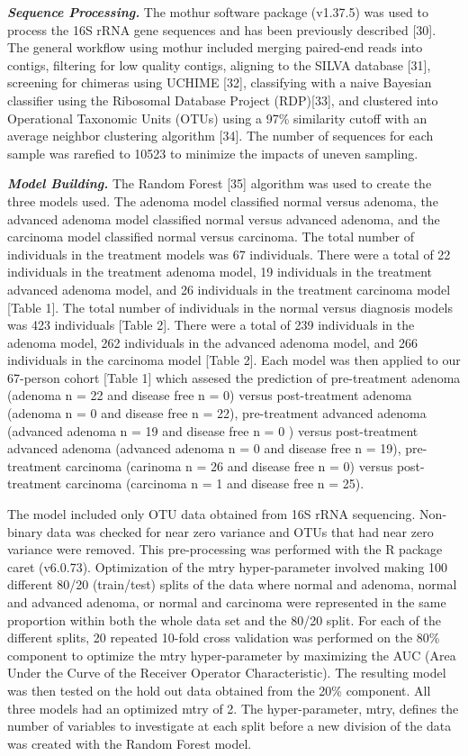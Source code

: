 \documentclass[12pt,]{article}
\begin{document}
\textbf{\emph{Sequence Processing.}} The mothur software package
(v1.37.5) was used to process the 16S rRNA gene sequences and has been
previously described {[}30{]}. The general workflow using mothur
included merging paired-end reads into contigs, filtering for low
quality contigs, aligning to the SILVA database {[}31{]}, screening for
chimeras using UCHIME {[}32{]}, classifying with a naive Bayesian
classifier using the Ribosomal Database Project (RDP){[}33{]}, and
clustered into Operational Taxonomic Units (OTUs) using a 97\%
similarity cutoff with an average neighbor clustering algorithm
{[}34{]}. The number of sequences for each sample was rarefied to 10523
to minimize the impacts of uneven sampling.

\textbf{\emph{Model Building.}} The Random Forest {[}35{]} algorithm was
used to create the three models used. The adenoma model classified
normal versus adenoma, the advanced adenoma model classified normal
versus advanced adenoma, and the carcinoma model classified normal
versus carcinoma. The total number of individuals in the treatment
models was 67 individuals. There were a total of 22 individuals in the
treatment adenoma model, 19 individuals in the treatment advanced
adenoma model, and 26 individuals in the treatment carcinoma model
{[}Table 1{]}. The total number of individuals in the normal versus
diagnosis models was 423 individuals {[}Table 2{]}. There were a total
of 239 individuals in the adenoma model, 262 individuals in the advanced
adenoma model, and 266 individuals in the carcinoma model {[}Table 2{]}.
Each model was then applied to our 67-person cohort {[}Table 1{]} which
assesed the prediction of pre-treatment adenoma (adenoma n = 22 and
disease free n = 0) versus post-treatment adenoma (adenoma n = 0 and
disease free n = 22), pre-treatment advanced adenoma (advanced adenoma n
= 19 and disease free n = 0 ) versus post-treatment advanced adenoma
(advanced adenoma n = 0 and disease free n = 19), pre-treatment
carcinoma (carinoma n = 26 and disease free n = 0) versus post-treatment
carcinoma (carcinoma n = 1 and disease free n = 25).

The model included only OTU data obtained from 16S rRNA sequencing.
Non-binary data was checked for near zero variance and OTUs that had
near zero variance were removed. This pre-processing was performed with
the R package caret (v6.0.73). Optimization of the mtry hyper-parameter
involved making 100 different 80/20 (train/test) splits of the data
where normal and adenoma, normal and advanced adenoma, or normal and
carcinoma were represented in the same proportion within both the whole
data set and the 80/20 split. For each of the different splits, 20
repeated 10-fold cross validation was performed on the 80\% component to
optimize the mtry hyper-parameter by maximizing the AUC (Area Under the
Curve of the Receiver Operator Characteristic). The resulting model was
then tested on the hold out data obtained from the 20\% component. All
three models had an optimized mtry of 2. The hyper-parameter, mtry,
defines the number of variables to investigate at each split before a
new division of the data was created with the Random Forest model.
\end{document}
